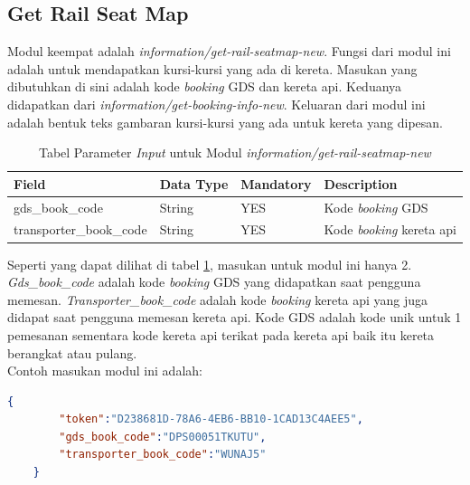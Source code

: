 \subsection{Get Rail Seat Map}
\label{subsec:getrailseatmap}

Modul keempat adalah \textit{information/get-rail-seatmap-new}. Fungsi dari modul ini adalah untuk mendapatkan kursi-kursi yang ada di kereta. Masukan yang dibutuhkan di sini adalah kode \textit{booking} GDS dan kereta api. Keduanya didapatkan dari \textit{information/get-booking-info-new}. Keluaran dari modul ini adalah bentuk teks gambaran kursi-kursi yang ada untuk kereta yang dipesan.

\begin{table}[H]
	\centering 
	\caption{Tabel Parameter \textit{Input} untuk Modul \textit{information/get-rail-seatmap-new}}
	\label{tab:getrailseatmapinput}
	\begin{tabular}{|l|l|l|l|}
		\hline
		Field & Data Type & Mandatory & Description\\
		\hline
		
		\hline
        gds\_book\_code & String & YES & Kode \textit{booking} GDS\\
        \hline
        transporter\_book\_code & String & YES & Kode \textit{booking} kereta api\\
        \hline
	\end{tabular} 
\end{table}

Seperti yang dapat dilihat di tabel \ref{tab:getrailseatmapinput}, masukan untuk modul ini hanya 2. \textit{Gds\_book\_code} adalah kode \textit{booking} GDS yang didapatkan saat pengguna memesan. \textit{Transporter\_book\_code} adalah kode \textit{booking} kereta api yang juga didapat saat pengguna memesan kereta api. Kode GDS adalah kode unik untuk 1 pemesanan sementara kode kereta api terikat pada kereta api baik itu kereta berangkat atau pulang.\\

Contoh masukan modul ini adalah:

\begin{lstlisting}[language=json]
    {
        "token":"D238681D-78A6-4EB6-BB10-1CAD13C4AEE5",
        "gds_book_code":"DPS00051TKUTU",
        "transporter_book_code":"WUNAJ5"
    }
\end{lstlisting}

